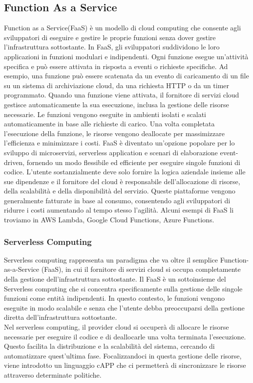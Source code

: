 \documentclass[../../main.tex]{subfiles}
\begin{document}
\subsection{Function As a  Service}
Function as a Service(FaaS) è un modello di cloud computing che consente agli sviluppatori di eseguire e gestire le proprie funzioni senza dover gestire l'infrastruttura sottostante.
In FaaS, gli sviluppatori suddividono le loro applicazioni in funzioni modulari e indipendenti. Ogni funzione esegue un'attività specifica e può essere attivata in risposta a eventi o richieste specifiche. Ad esempio, una funzione può essere scatenata da un evento di caricamento di un file su un sistema di archiviazione cloud, da una richiesta HTTP o da un timer programmato. Quando una funzione viene attivata, il fornitore di servizi cloud gestisce automaticamente la sua esecuzione, inclusa la gestione delle risorse necessarie. Le funzioni vengono eseguite in ambienti isolati e scalati automaticamente in base alle richieste di carico. Una volta completata l'esecuzione della funzione, le risorse vengono deallocate per massimizzare l'efficienza e minimizzare i costi.
FaaS è diventato un'opzione popolare per lo sviluppo di microservizi, serverless application e scenari di elaborazione event-driven, fornendo un modo flessibile ed efficiente per eseguire singole funzioni di codice.
L'utente sostanzialmente deve solo fornire la logica aziendale insieme alle sue dipendenze e il fornitore del cloud è responsabile dell'allocazione di risorse, della scalabilità e della disponibilità del servizio. Queste piattaforme vengono generalmente fatturate in base al consumo, consentendo agli sviluppatori di ridurre i costi aumentando al tempo stesso l'agilità.\autocite{bhatt2022study}
Alcuni esempi di FaaS li troviamo in AWS Lambda, Google Cloud Functions, Azure Functions.

\subsubsection{Serverless Computing}
Serverless computing rappresenta un paradigma che va oltre il semplice Function-as-a-Service (FaaS), in cui il fornitore di servizi cloud si occupa completamente della gestione dell'infrastruttura sottostante. Il FaaS è un sottoinsieme del Serverless computing che si concentra specificamente sulla gestione delle singole funzioni come entità indipendenti. In questo contesto, le funzioni vengono eseguite in modo scalabile e senza che l'utente debba preoccuparsi della gestione diretta dell'infrastruttura sottostante.\autocite{amslaurea24930}\\
Nel serverless computing, il provider cloud si occuperà di allocare le risorse necessarie per eseguire il codice e di deallocarle una volta terminata l'esecuzione. Questo facilita la distribuzione e la scalabilità del sistema, cercando di automatizzare quest'ultima fase.
Focalizzandoci in questa gestione delle risorse, viene introdotto un linguaggio cAPP che ci permetterà di sincronizzare le risorse attraverso determinate politiche.\autocite{DBLP:journals/corr/abs-1902-03383}
\newpage
\end{document}
